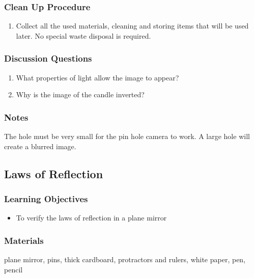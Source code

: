 \subsubsection*{Clean Up Procedure}
\begin{enumerate}
\item{Collect all the used materials, cleaning and storing items that will be used later. No special waste disposal is required.} 
\end{enumerate}

\subsubsection*{Discussion Questions}
\begin{enumerate}
\item{What properties of light allow the image to appear?}
\item{Why is the image of the candle inverted?}
\end{enumerate}

\subsubsection*{Notes}
The hole must be very small for the pin hole camera to work. A large hole will create a blurred image.  


\subsection{Laws of Reflection}

\subsubsection*{Learning Objectives}
\begin{itemize}
\item{To verify the laws of reflection in a plane mirror}
\end{itemize}

\subsubsection*{Materials}
plane mirror, pins, thick cardboard, protractors and rulers, white paper, pen, pencil

